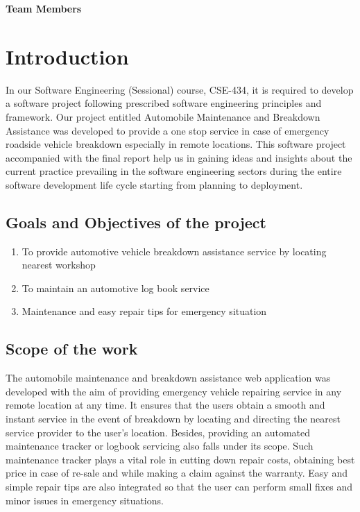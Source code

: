 \documentclass[11pt]{article} %
\date{} %
\begin{document}
\maketitle %

\begin{center}
 
	\Large\textbf{Team Members}
\end{center}

\newpage
\tableofcontents
\pagebreak
\listoffigures

\listoftables
\pagebreak

\section{Introduction}
In our Software Engineering (Sessional) course, CSE-434, it is required to develop a software project following prescribed software engineering principles and framework. Our project entitled Automobile Maintenance and Breakdown Assistance was developed to provide a one stop service in case of emergency roadside vehicle breakdown especially in remote locations. This software project accompanied with the final report help us in gaining ideas and insights about the current practice prevailing in the software engineering sectors during the entire software development life cycle starting from planning to deployment.
	\subsection{Goals and Objectives of the project}
	\begin{enumerate}
	\item To provide automotive vehicle breakdown assistance service by locating nearest workshop 
	\item To maintain an automotive log book service
	\item Maintenance and easy repair tips for emergency situation
	\end{enumerate}
	\subsection{Scope of the work}
	The automobile maintenance and breakdown assistance web application was developed with the aim of providing emergency vehicle repairing service in any remote location at any time. It ensures that the users obtain a smooth and instant service in the event of breakdown by locating and directing the nearest service provider to the user's location. Besides, providing an automated maintenance tracker or logbook servicing also falls under its scope. Such maintenance tracker plays a vital role in cutting down repair costs, obtaining best price in case of re-sale and while making a claim against the warranty. Easy and simple repair tips are also integrated so that the user can perform small fixes and minor issues in emergency situations.
	
\end{document}

